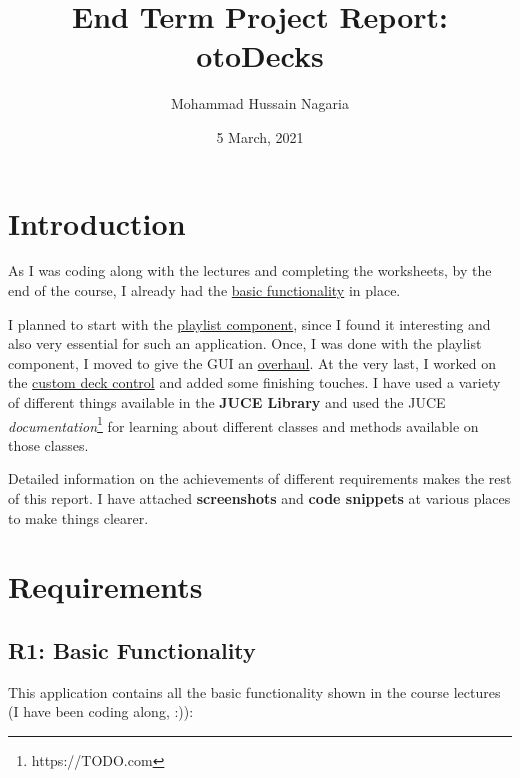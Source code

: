 \documentclass[12pt,]{article}
\title{End Term Project Report: otoDecks}
\author{Mohammad Hussain Nagaria}
\date{5 March, 2021}
\begin{document}
\maketitle

{
\hypersetup{linkcolor=}
\setcounter{tocdepth}{3}
\tableofcontents
}
\hypertarget{introduction}{%
\section{Introduction}\label{introduction}}

As I was coding along with the lectures and completing the worksheets,
by the end of the course, I already had the
\protect\hyperlink{r1-basic-functionality}{basic functionality} in
place.

I planned to start with the
\protect\hyperlink{r3-the-music-library}{playlist component}, since I
found it interesting and also very essential for such an application.
Once, I was done with the playlist component, I moved to give the GUI an
\protect\hyperlink{r4-the-new-gui-layout}{overhaul}. At the very last, I
worked on the \protect\hyperlink{r2-the-custom-deck-control}{custom deck
control} and added some finishing touches. I have used a variety of
different things available in the \textbf{JUCE Library} and used the
JUCE \emph{documentation}\footnote{https://TODO.com} for learning about
different classes and methods available on those classes.

Detailed information on the achievements of different requirements makes
the rest of this report. I have attached \textbf{screenshots} and
\textbf{code snippets} at various places to make things clearer.

\hypertarget{requirements}{%
\section{Requirements}\label{requirements}}

\hypertarget{r1-basic-functionality}{%
\subsection{R1: Basic Functionality}\label{r1-basic-functionality}}

This application contains all the basic functionality shown in the
course lectures (I have been coding along, :)):
\end{document}

